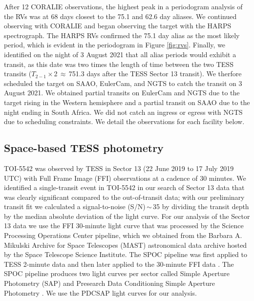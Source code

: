 \documentclass{aa}
\begin{document}
After 12 CORALIE observations, the highest peak in a periodogram analysis of the RVs was at 68 days closest to the 75.1 and 62.6 day aliases. We continued observing with CORALIE and began observing the target with the HARPS spectrograph. The HARPS RVs confirmed the 75.1 day alias as the most likely period, which is evident in the periodogram in Figure \ref{fig:rvs}. Finally, we identified on the night of 3 August 2021 that all alias periods would exhibit a transit, as this date was two times the length of time between the two TESS transits ($T_{2-1}\times$2\,$\approx$\,751.3 days after the TESS Sector 13 transit). We therfore scheduled the target on SAAO, EulerCam, and NGTS to catch the transit on 3 August 2021. We obtained partial transits on EulerCam and NGTS due to the target rising in the Western hemisphere and a partial transit on SAAO due to the night ending in South Africa. We did not catch an ingress or egress with NGTS due to scheduling constraints. We detail the observations for each facility below.

\subsection{Space-based TESS photometry}

TOI-5542 was observed by TESS in Sector 13 (22 June 2019 to 17 July 2019 UTC) with Full Frame Image (FFI) observations at a cadence of 30 minutes. We identified a single-transit event in TOI-5542 in our search of Sector 13 data that was clearly significant compared to the out-of-transit data; with our preliminary transit fit we calculated a signal-to-noise (S/N)\,$\sim$\,35 by dividing the transit depth by the median absolute deviation of the light curve. For our analysis of the Sector 13 data we use the FFI 30-minute light curve that was processed by the Science Processing Operations Center \citep[SPOC;][]{Jenkins2016} pipeline, which we obtained from the Barbara A. Mikulski Archive for Space Telescopes (MAST) astronomical data archive hosted by the Space Telescope Science Institute. The SPOC pipeline was first applied to TESS 2-minute data and then later applied to the 30-minute FFI data \citep{Caldwell2020}. The SPOC pipeline produces two light curves per sector called Simple Aperture Photometry (SAP) and Presearch Data Conditioning Simple Aperture Photometry \citep[PDCSAP;][]{Smith2012,Stumpe2012,Stumpe2014}. We use the PDCSAP light curves for our analysis. 
\end{document}
